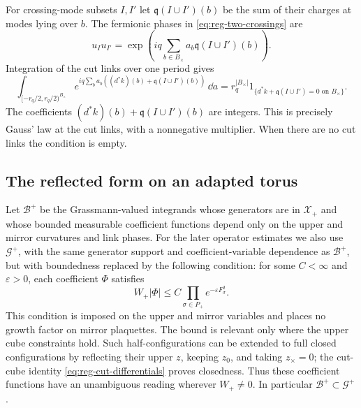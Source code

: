 For crossing-mode subsets $I,I'$ let
$\mathfrak q(I\cup I')(b)$ be the sum of their charges at modes lying
over $b$. The fermionic phases in \eqref{eq:reg-two-crossings} are
\[
 u_Iu_{I'}=\exp\left(iq\sum_{b\in B_\times}
                              a_b\mathfrak q(I\cup I')(b)\right).
\]
Integration of the cut links over one period gives
\begin{equation}\label{eq:reg-gauss-indicator}
 \int_{[-r_q/2,r_q/2)^{B_\times}}
 e^{iq\sum_ba_b((d^*k)(b)+\mathfrak q(I\cup I')(b))}\,\dd a
 =r_q^{|B_\times|}
   1_{\{d^*k+\mathfrak q(I\cup I')=0\text{ on }B_\times\}}.
\end{equation}
The coefficients $(d^*k)(b)+\mathfrak q(I\cup I')(b)$ are integers.
This is precisely
Gauss' law at the cut links, with a nonnegative multiplier. When
there are no cut links the condition is empty.

\subsection{The reflected form on an adapted torus}
\label{subsec:reg-reflected-form}

Let $\mathcal B^+$ be the Grassmann-valued integrands whose
generators are in $\mathcal X_+$ and whose bounded measurable
coefficient functions depend only on the upper and mirror
curvatures and link phases. For the later operator estimates we
also use $\mathcal G^+$, with the same generator support and
coefficient-variable dependence as $\mathcal B^+$, but with boundedness
replaced by the following condition: for some $C<\infty$ and
$\varepsilon>0$, each coefficient $\Phi$ satisfies
\begin{equation}\label{eq:reg-upper-growth}
 W_+|\Phi|\le C\prod_{\sigma\in P_+}e^{-\varepsilon F_\sigma^2}.
\end{equation}
This condition is imposed on the upper and mirror variables and
places no growth factor on mirror plaquettes. The bound is relevant
only where the upper cube constraints hold. Such half-configurations
can be extended to full closed configurations by reflecting their
upper $z$, keeping $z_0$, and taking $z_\times=0$; the cut-cube
identity \eqref{eq:reg-cut-differentials} proves closedness. Thus
these coefficient functions have an unambiguous reading wherever
$W_+\ne0$. In particular $\mathcal B^+\subset\mathcal G^+$.


